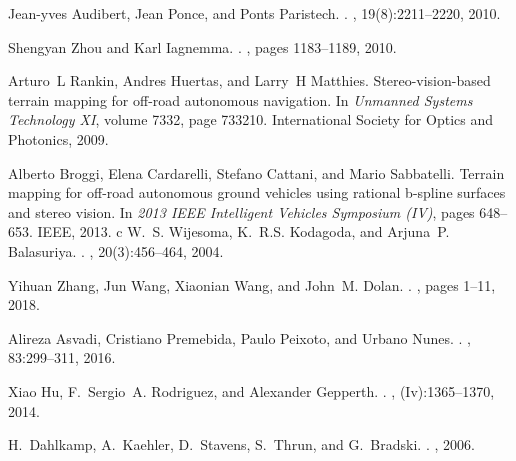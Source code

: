 \documentclass[letterpaper, 10 pt, conference]{ieeeconf}  %
\begin{document}
\begin{thebibliography}{99}
	Jean-yves Audibert, Jean Ponce, and Ponts Paristech.
	.
	, 19(8):2211--2220, 2010.
	
	Shengyan Zhou and Karl Iagnemma.
	.
	, pages 1183--1189, 2010.
	
	Arturo~L Rankin, Andres Huertas, and Larry~H Matthies.
	\newblock Stereo-vision-based terrain mapping for off-road autonomous
	navigation.
	\newblock In {\em Unmanned Systems Technology XI}, volume 7332, page 733210.
	International Society for Optics and Photonics, 2009.
	
	Alberto Broggi, Elena Cardarelli, Stefano Cattani, and Mario Sabbatelli.
	\newblock Terrain mapping for off-road autonomous ground vehicles using
	rational b-spline surfaces and stereo vision.
	\newblock In {\em 2013 IEEE Intelligent Vehicles Symposium (IV)}, pages
	648--653. IEEE, 2013.
	c
	W.~S. Wijesoma, K.~R.S. Kodagoda, and Arjuna~P. Balasuriya.
	.
	, 20(3):456--464,
	2004.
	
	Yihuan Zhang, Jun Wang, Xiaonian Wang, and John~M. Dolan.
	.
	, pages
	1--11, 2018.
	
	Alireza Asvadi, Cristiano Premebida, Paulo Peixoto, and Urbano Nunes.
	.
	, 83:299--311, 2016.
	
	Xiao Hu, F.~Sergio~A. Rodriguez, and Alexander Gepperth.
	.
	,
	(Iv):1365--1370, 2014.
	
	H.~Dahlkamp, A.~Kaehler, D.~Stavens, S.~Thrun, and G.~Bradski.
	.
	, 2006.
	

\end{thebibliography}
\end{document}
